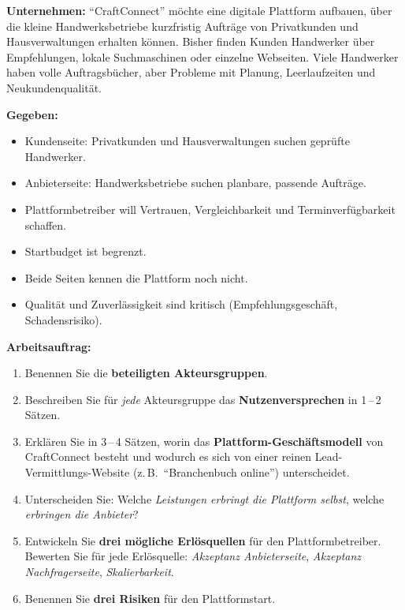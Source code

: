 \documentclass[11pt,a4paper,oneside]{article}
\begin{document}
\begin{infobox}[Fallbeschreibung]
\textbf{Unternehmen:} ``CraftConnect'' möchte eine digitale Plattform aufbauen, über die kleine Handwerksbetriebe kurzfristig Aufträge von Privatkunden und Hausverwaltungen erhalten können. Bisher finden Kunden Handwerker über Empfehlungen, lokale Suchmaschinen oder einzelne Webseiten. Viele Handwerker haben volle Auftragsbücher, aber Probleme mit Planung, Leerlaufzeiten und Neukundenqualität.

\smallskip
\textbf{Gegeben:}
\begin{itemize}
  \item Kundenseite: Privatkunden und Hausverwaltungen suchen geprüfte Handwerker.
  \item Anbieterseite: Handwerksbetriebe suchen planbare, passende Aufträge.
  \item Plattformbetreiber will Vertrauen, Vergleichbarkeit und Terminverfügbarkeit schaffen.
  \item Startbudget ist begrenzt.
  \item Beide Seiten kennen die Plattform noch nicht.
  \item Qualität und Zuverlässigkeit sind kritisch (Empfehlungsgeschäft, Schadensrisiko).
\end{itemize}
\end{infobox}

\noindent\textbf{Arbeitsauftrag:}

\begin{enumerate}
  \item Benennen Sie die \textbf{beteiligten Akteursgruppen}.
  \item Beschreiben Sie für \emph{jede} Akteursgruppe das \textbf{Nutzenversprechen} in 1\,--\,2 Sätzen.
  \item Erklären Sie in 3\,--\,4 Sätzen, worin das \textbf{Plattform-Geschäftsmodell} von CraftConnect besteht \textendash{} und wodurch es sich von einer reinen Lead-Vermittlungs-Website (z.\,B.\ ``Branchenbuch online'') unterscheidet.
  \item Unterscheiden Sie: Welche \emph{Leistungen erbringt die Plattform selbst}, welche \emph{erbringen die Anbieter}?
  \item Entwickeln Sie \textbf{drei mögliche Erlösquellen} für den Plattformbetreiber. Bewerten Sie für jede Erlösquelle: \emph{Akzeptanz Anbieterseite}, \emph{Akzeptanz Nachfragerseite}, \emph{Skalierbarkeit}.
  \item Benennen Sie \textbf{drei Risiken} für den Plattformstart.
\end{enumerate}
\end{document}
